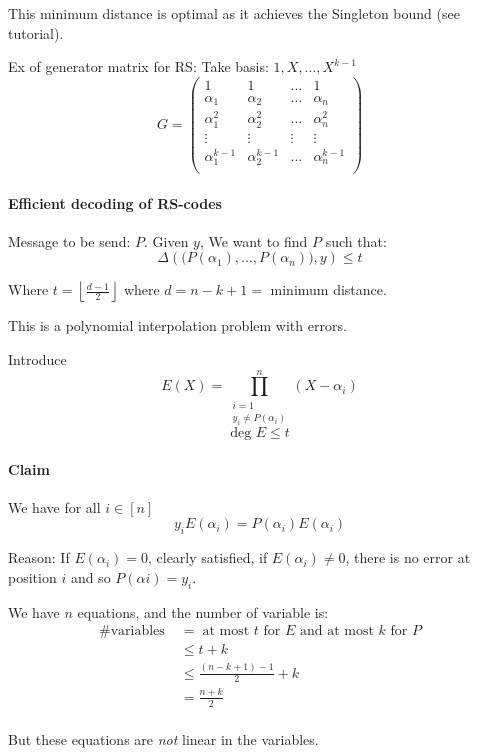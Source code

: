 \documentclass{article}
\begin{document}
This minimum distance is optimal as it achieves the Singleton bound (see tutorial).

Ex of generator matrix for RS: Take basis: $1,X,...,X^{k-1}$
\[ G =
\begin{pmatrix}
1 & 1 & ... & 1\\
\alpha_1 & \alpha_2 & ... & \alpha_n \\
\alpha_1^2 & \alpha_2^2 & ... & \alpha_n^2 \\
\vdots & \vdots & \vdots & \vdots \\
\alpha_1^{k-1} & \alpha_2^{k-1} & ... & \alpha_n^{k-1} \\
\end{pmatrix}\]


\paragraph{Efficient decoding of RS-codes} Message to be send: $P$. Given $y$, We want to find $P$ such that:
\[\Delta \left( \big( P(\alpha_1),...,P(\alpha_n) \big) , y  \right) \leq t\]

Where $t=\left\lfloor \frac{d-1}{2} \right\rfloor $ where $d = n - k + 1 =$ minimum distance.

This is a polynomial interpolation problem with errors.

Introduce 
\[E(X)= \prod_{\substack{i=1 \\ y_i \neq P(\alpha_i)}}^n (X-\alpha_i) \tag{error locator poly}\]
\[\text{deg }E\leq t\]

\paragraph{Claim} We have for all $i\in [n]$
\[ y_i E(\alpha_i)=P(\alpha_i)E(\alpha_i) \]

Reason: If $E(\alpha_i)=0$, clearly satisfied, if $E(\alpha_i)\neq 0$, there is no error at position $i$ and so $P(\alpha i)=y_i$.

We have $n$ equations, and the number of variable is:
\begin{align*}
\text{\# variables}\; & = \;\text{at most $t$ for $E$ and at most $k$ for $P$}\\
& \leq t + k\\
& \leq \frac{(n-k+1)-1}{2}+k\\
& = \frac{n+k}{2}\\
\end{align*}

But these equations are \emph{not} linear in the variables.
\end{document}

